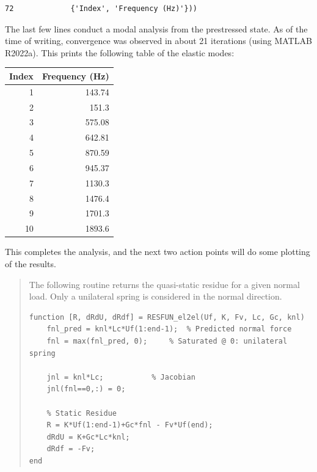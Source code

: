 \documentclass[11pt]{article}
\begin{document}
\begin{enumerate}
\begin{verbatim}
72             {'Index', 'Frequency (Hz)'}))
\end{verbatim}
The last few lines conduct a modal analysis from the prestressed state.
As of the time of writing, convergence was observed in about 21 iterations (using MATLAB R2022a).
This prints the following table of the elastic modes:
\begin{center}
\begin{tabular}{rr}
Index & Frequency (Hz)\\[0pt]
\hline
1 & 143.74\\[0pt]
2 & 151.3\\[0pt]
3 & 575.08\\[0pt]
4 & 642.81\\[0pt]
5 & 870.59\\[0pt]
6 & 945.37\\[0pt]
7 & 1130.3\\[0pt]
8 & 1476.4\\[0pt]
9 & 1701.3\\[0pt]
10 & 1893.6\\[0pt]
\end{tabular}
\end{center}
\end{enumerate}
This completes the analysis, and the next two action points will do some plotting of the results.

\begin{quote}
                              \begin{tcolorbox}[colback=osbe-bg,colframe=osbe-fg,title={Static Residue Routine RESFUN.m},sharp corners,boxrule=0.4pt]
The following routine returns the quasi-static residue for a given normal load.
Only a unilateral spring is considered in the normal direction.
\begin{verbatim}
function [R, dRdU, dRdf] = RESFUN_el2el(Uf, K, Fv, Lc, Gc, knl)
    fnl_pred = knl*Lc*Uf(1:end-1);	% Predicted normal force
    fnl = max(fnl_pred, 0);		% Saturated @ 0: unilateral spring

    jnl = knl*Lc;			% Jacobian
    jnl(fnl==0,:) = 0;			

    % Static Residue
    R = K*Uf(1:end-1)+Gc*fnl - Fv*Uf(end);
    dRdU = K+Gc*Lc*knl;
    dRdf = -Fv;
end
\end{verbatim}


               \end{tcolorbox}
\end{quote}
\end{document}
